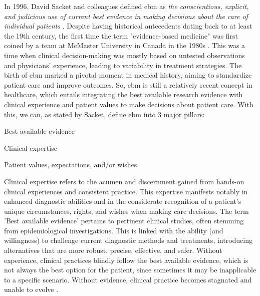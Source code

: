 In 1996, David Sacket and colleagues defined \ac{ebm} as \textit{the conscientious, explicit, and judicious use of current best evidence in making decisions about the care of individual patients} \cite{sackettEvidenceBasedMedicine1996}. Despite having historical antecedents dating back to at least the 19th century, the first time the term "evidence-based medicine" was first coined by a team at McMaster University in Canada in the 1980s \cite{thomaBriefHistoryEvidenceBased2015}. This was a time when clinical decision-making was mostly based on untested observations and physicians' experience, leading to variability in treatment strategies. The birth of \ac{ebm} marked a pivotal moment in medical history, aiming to standardize patient care and improve outcomes. So, \ac{ebm} is still a relatively recent concept in healthcare, which entails integrating the best available research evidence with clinical experience and patient values to make decisions about patient care. 
With this, we can, as stated by Sacket, define \ac{ebm} into 3 major pillars:
\begin{myitemize}
    \item Best available evidence
    \item Clinical expertise
    \item Patient values, expectations, and/or wishes.
\end{myitemize}

Clinical expertise refers to the acumen and discernment gained from hands-on clinical experiences and consistent practice. This expertise manifests notably in enhanced diagnostic abilities and in the considerate recognition of a patient's unique circumstances, rights, and wishes when making care decisions. The term 'Best available evidence' pertains to pertinent clinical studies, often stemming from epidemiological investigations. This is linked with the ability (and willingness) to challenge current diagnostic methods and treatments, introducing alternatives that are more robust, precise, effective, and safer. 
Without experience, clinical practices blindly follow the best available evidence, which is not always the best option for the patient, since sometimes it may be inapplicable to a specific scenario. Without evidence, clinical practice becomes stagnated and unable to evolve \cite{sackettEvidenceBasedMedicine1996}.


